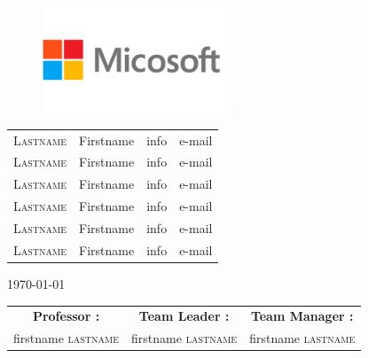 \documentclass{article} %
\numberwithin{equation}{section} %
\begin{document}
\begin{titlepage}
\begin{sffamily}
\begin{center}
        \begin{figure}[h!]
        \centering
        \includegraphics[width=0.5\textwidth]{logo_micosoft.png}
        \end{figure}

\vspace{1cm}
\large   
    
    \begin{table}[ht!]
        \centering
        \large
             
            \begin{tabular}{lccr}
               
                \Large{\textsc{Lastname}} & \Large{Firstname} & info & e-mail\\
                \Large{\textsc{Lastname}} & \Large{Firstname} & info & e-mail\\
                \Large{\textsc{Lastname}} & \Large{Firstname} & info & e-mail\\
                \Large{\textsc{Lastname}} & \Large{Firstname} & info & e-mail\\
                \Large{\textsc{Lastname}} & \Large{Firstname} & info & e-mail\\
                \Large{\textsc{Lastname}} & \Large{Firstname} & info & e-mail\\

            \end{tabular}
    \end{table}
\vspace{1cm}
    \begin{center}
        {\rm \today}
    \end{center}
    
    
\vfill

\begin{tabular}{c c c}
    \textrm{\textbf{Professor :}} & \textrm{\textbf{Team Leader :}} &\textrm{\textbf{Team Manager :}}\\
    \textrm{firstname \textsc{lastname}} & \textrm{firstname \textsc{lastname}} & \textrm{firstname \textsc{lastname}}
\end{tabular}
    
\end{center}
\end{sffamily}
\end{titlepage}
\end{document}
